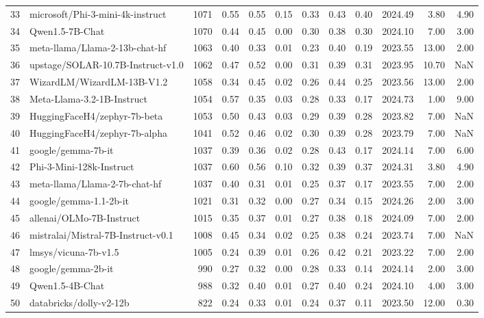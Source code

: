 \begin{tiny}
\begin{tabular}{llrrrrrrrrrr}
    33 & microsoft/Phi-3-mini-4k-instruct & 1071 & 0.55 & 0.55 & 0.15 & 0.33 & 0.43 & 0.40 & 2024.49 & 3.80 & 4.90 \\
    34 & Qwen1.5-7B-Chat & 1070 & 0.44 & 0.45 & 0.00 & 0.30 & 0.38 & 0.30 & 2024.10 & 7.00 & 3.00 \\
    35 & meta-llama/Llama-2-13b-chat-hf & 1063 & 0.40 & 0.33 & 0.01 & 0.23 & 0.40 & 0.19 & 2023.55 & 13.00 & 2.00 \\
    36 & upstage/SOLAR-10.7B-Instruct-v1.0 & 1062 & 0.47 & 0.52 & 0.00 & 0.31 & 0.39 & 0.31 & 2023.95 & 10.70 & NaN \\
    37 & WizardLM/WizardLM-13B-V1.2 & 1058 & 0.34 & 0.45 & 0.02 & 0.26 & 0.44 & 0.25 & 2023.56 & 13.00 & 2.00 \\
    38 & Meta-Llama-3.2-1B-Instruct & 1054 & 0.57 & 0.35 & 0.03 & 0.28 & 0.33 & 0.17 & 2024.73 & 1.00 & 9.00 \\
    39 & HuggingFaceH4/zephyr-7b-beta & 1053 & 0.50 & 0.43 & 0.03 & 0.29 & 0.39 & 0.28 & 2023.82 & 7.00 & NaN \\
    40 & HuggingFaceH4/zephyr-7b-alpha & 1041 & 0.52 & 0.46 & 0.02 & 0.30 & 0.39 & 0.28 & 2023.79 & 7.00 & NaN \\
    41 & google/gemma-7b-it & 1037 & 0.39 & 0.36 & 0.02 & 0.28 & 0.43 & 0.17 & 2024.14 & 7.00 & 6.00 \\
    42 & Phi-3-Mini-128k-Instruct & 1037 & 0.60 & 0.56 & 0.10 & 0.32 & 0.39 & 0.37 & 2024.31 & 3.80 & 4.90 \\
    43 & meta-llama/Llama-2-7b-chat-hf & 1037 & 0.40 & 0.31 & 0.01 & 0.25 & 0.37 & 0.17 & 2023.55 & 7.00 & 2.00 \\
    44 & google/gemma-1.1-2b-it & 1021 & 0.31 & 0.32 & 0.00 & 0.27 & 0.34 & 0.15 & 2024.26 & 2.00 & 3.00 \\
    45 & allenai/OLMo-7B-Instruct & 1015 & 0.35 & 0.37 & 0.01 & 0.27 & 0.38 & 0.18 & 2024.09 & 7.00 & 2.00 \\
    46 & mistralai/Mistral-7B-Instruct-v0.1 & 1008 & 0.45 & 0.34 & 0.02 & 0.25 & 0.38 & 0.24 & 2023.74 & 7.00 & NaN \\
    47 & lmsys/vicuna-7b-v1.5 & 1005 & 0.24 & 0.39 & 0.01 & 0.26 & 0.42 & 0.21 & 2023.22 & 7.00 & 2.00 \\
    48 & google/gemma-2b-it & 990 & 0.27 & 0.32 & 0.00 & 0.28 & 0.33 & 0.14 & 2024.14 & 2.00 & 3.00 \\
    49 & Qwen1.5-4B-Chat & 988 & 0.32 & 0.40 & 0.01 & 0.27 & 0.40 & 0.24 & 2024.10 & 4.00 & 3.00 \\
    50 & databricks/dolly-v2-12b & 822 & 0.24 & 0.33 & 0.01 & 0.24 & 0.37 & 0.11 & 2023.50 & 12.00 & 0.30 \\
    \bottomrule
    \end{tabular}
    \end{tiny}
    